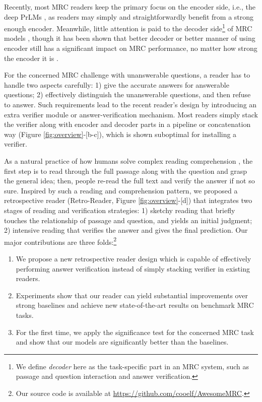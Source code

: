 \documentclass[letterpaper]{article} %
\begin{document}
Recently, most MRC readers keep the primary focus on the encoder side, i.e., the deep PrLMs \cite{devlin2018bert,yang2019xlnet,Lan2020ALBERT}, as readers may simply and straightforwardly benefit from a strong enough encoder. Meanwhile, little attention is paid to the decoder side\footnote{We define \textit{decoder} here as the task-specific part in an MRC system, such as passage and question interaction and answer verification.} of MRC models %
\cite{hu2019read,back2020neurquri,reddy2020answer}, though it has been shown that better decoder or better manner of using encoder still has a significant impact on MRC performance, no matter how strong the encoder it is \cite{dcmn20,liu2021filling,li2019dependency,li2018unified,zhu2020dual}.


For the concerned MRC challenge with unanswerable questions, a reader has to handle two aspects carefully: 1) give the accurate answers for answerable questions; 2) effectively distinguish the unanswerable questions, and then refuse to answer. Such requirements lead to the recent reader's design by introducing an extra verifier module or answer-verification mechanism. Most readers simply stack the verifier along with encoder and decoder parts in a pipeline or concatenation way (Figure \ref{fig:overview}-[b-c]), which is shown suboptimal for installing a verifier.

As a natural practice of how humans solve complex reading comprehension \cite{DBLP:conf/sigir/ZhengMLYZM19,doi:10.1080/00461520.1987.9653053}, the first step is to read through the full passage along with the question and grasp the general idea; then, people re-read the full text and verify the answer if not so sure. Inspired by such a reading and comprehension pattern, we proposed a retrospective reader (Retro-Reader, Figure \ref{fig:overview}-[d]) that integrates two stages of reading and verification strategies: 1) sketchy reading that briefly touches the relationship of passage and question, and yields an initial judgment; 2) intensive reading that verifies the answer and gives the final prediction. Our major contributions are three folds:\footnote{Our source code is available at \url{https://github.com/cooelf/AwesomeMRC}.}

\begin{enumerate}
\item We propose a new retrospective reader design which is capable of effectively performing answer verification instead of simply stacking verifier in existing readers.
\item Experiments show that our reader can yield substantial improvements over strong baselines and achieve new state-of-the-art results on benchmark MRC tasks.
\item For the first time, we apply the significance test for the concerned MRC task and show that our models are significantly better than the baselines.
\end{enumerate}
\end{document}
